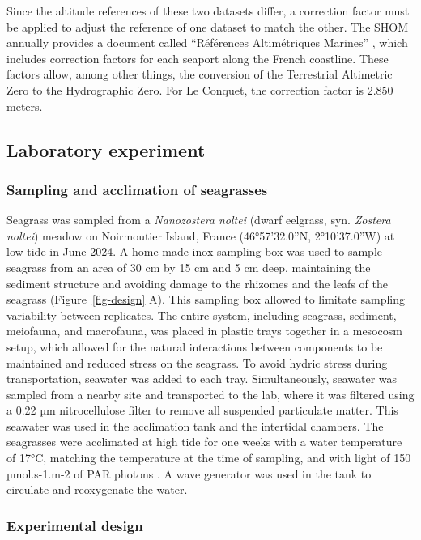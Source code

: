 \documentclass[
  number]{elsarticle}
\begin{document}
Since the altitude references of these two datasets differ, a correction
factor must be applied to adjust the reference of one dataset to match
the other. The SHOM annually provides a document called ``Références
Altimétriques Marines'' \citep[RAM,][]{shom_ram_2022}, which includes
correction factors for each seaport along the French coastline. These
factors allow, among other things, the conversion of the Terrestrial
Altimetric Zero to the Hydrographic Zero. For Le Conquet, the correction
factor is 2.850 meters.

\subsection{Laboratory experiment}\label{laboratory-experiment}

\subsubsection{Sampling and acclimation of
seagrasses}\label{sampling-and-acclimation-of-seagrasses}

Seagrass was sampled from a \emph{Nanozostera noltei} (dwarf eelgrass,
syn. \emph{Zostera noltei}) meadow on Noirmoutier Island, France
(46°57'32.0''N, 2°10'37.0''W) at low tide in June 2024. A home-made inox
sampling box was used to sample seagrass from an area of 30 cm by 15 cm
and 5 cm deep, maintaining the sediment structure and avoiding damage to
the rhizomes and the leafs of the seagrass (Figure~\ref{fig-design} A).
This sampling box allowed to limitate sampling variability between
replicates. The entire system, including seagrass, sediment, meiofauna,
and macrofauna, was placed in plastic trays together in a mesocosm
setup, which allowed for the natural interactions between components to
be maintained and reduced stress on the seagrass. To avoid hydric stress
during transportation, seawater was added to each tray. Simultaneously,
seawater was sampled from a nearby site and transported to the lab,
where it was filtered using a 0.22 µm nitrocellulose filter to remove
all suspended particulate matter. This seawater was used in the
acclimation tank and the intertidal chambers. The seagrasses were
acclimated at high tide for one weeks with a water temperature of 17°C,
matching the temperature at the time of sampling, and with light of 150
µmol.s-1.m-2 of PAR photons \citep{akbar2020mangrove}. A wave generator
was used in the tank to circulate and reoxygenate the water.

\subsubsection{Experimental design}\label{experimental-design}
\end{document}
